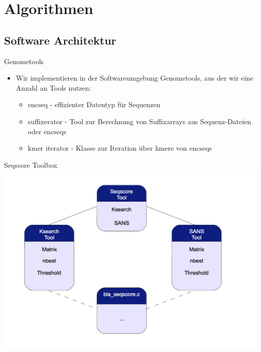 \documentclass[xcolor=dvipsnames, aspectratio=1610]{beamer}
\begin{document}
\section{Algorithmen}

\subsection{Software Architektur}

\begin{frame}{Genometools}
  \begin{itemize}
    \item Wir implementieren in der Softwareumgebung Genometools, aus der wir eine Anzahl an Tools nutzen:
    \begin{itemize}
      \item encseq - effizienter Datentyp für Sequenzen
      \item suffixerator - Tool zur Berechnung von Suffixarrays aus Sequenz-Dateien oder encseqs
      \item kmer iterator - Klasse zur Iteration über kmere von encseqs
    \end{itemize}    
  \end{itemize}
\end{frame}

\begin{frame}{Seqscore Toolbox}
  \includegraphics[width=\linewidth, t]{img/dia1.png}
\end{frame}
\end{document}
